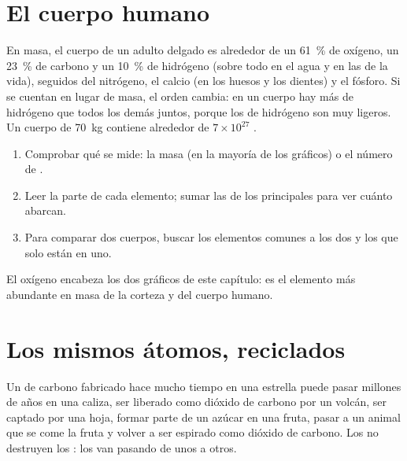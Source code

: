\section{El cuerpo humano}

\begin{proposition}\label{prop:g9:elements-universe-earth:body}
En masa, el cuerpo de un adulto delgado es alrededor de un
\qty{61}{\percent} de oxígeno, un \qty{23}{\percent} de carbono y un
\qty{10}{\percent} de hidrógeno (sobre todo en el agua y en las
 de la vida), seguidos del nitrógeno, el calcio (en los huesos
y los dientes) y el fósforo. Si se cuentan  en lugar de masa, el
orden cambia: en un cuerpo hay más  de hidrógeno que todos los
demás  juntos, porque los  de hidrógeno son muy ligeros. Un
cuerpo de \qty{70}{kg} contiene alrededor de $7 \times 10^{27}$ .
\end{proposition}

\begin{method}\label{met:g9:elements-universe-earth:read}
\begin{enumerate}
  \item Comprobar qué se mide: la masa (en la mayoría de los gráficos) o
        el número de .
  \item Leer la parte de cada elemento; sumar las de los principales
        para ver cuánto abarcan.
  \item Para comparar dos cuerpos, buscar los elementos comunes a los
        dos y los que solo están en uno.
\end{enumerate}
El oxígeno encabeza los dos gráficos de este capítulo: es el elemento
más abundante en masa de la corteza y del cuerpo humano.
\end{method}

\section{Los mismos átomos, reciclados}

\begin{example}\label{ex:g9:elements-universe-earth:journey}
Un  de carbono fabricado hace mucho tiempo en una estrella puede
pasar millones de años en una caliza, ser liberado como dióxido de
carbono por un volcán, ser captado por una hoja, formar parte de un
azúcar en una fruta, pasar a un animal que se come la fruta y volver a
ser espirado como dióxido de carbono. Los  no destruyen
los : los van pasando de unos a otros.
\end{example}

